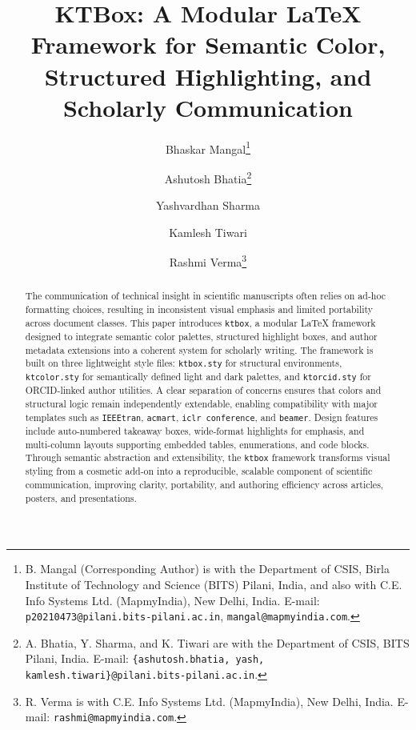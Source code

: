 \documentclass[12pt,onecolumn]{article}
\date{} %
\begin{document}
\title{KTBox: A Modular LaTeX Framework for Semantic Color, Structured Highlighting, and Scholarly Communication}


\author{%
  Bhaskar Mangal\thanks{B. Mangal (Corresponding Author) is with the Department of CSIS, Birla Institute of Technology and Science (BITS) Pilani, India, and also with C.E. Info Systems Ltd. (MapmyIndia), New Delhi, India. E-mail: \texttt{p20210473@pilani.bits-pilani.ac.in}, \texttt{mangal@mapmyindia.com}.}%
  \and
  Ashutosh Bhatia\thanks{A. Bhatia, Y. Sharma, and K. Tiwari are with the Department of CSIS, BITS Pilani, India. E-mail: \texttt{\{ashutosh.bhatia, yash, kamlesh.tiwari\}@pilani.bits-pilani.ac.in}.}%
  \and
  Yashvardhan Sharma%
  \and
  Kamlesh Tiwari%
  \and
  Rashmi Verma\thanks{R. Verma is with C.E. Info Systems Ltd. (MapmyIndia), New Delhi, India. E-mail: \texttt{rashmi@mapmyindia.com}.}%
}


  \maketitle

  \begin{abstract}
The communication of technical insight in scientific manuscripts often relies on ad-hoc formatting choices, resulting in inconsistent visual emphasis and limited portability across document classes. This paper introduces \texttt{ktbox}, a modular LaTeX framework designed to integrate semantic color palettes, structured highlight boxes, and author metadata extensions into a coherent system for scholarly writing. The framework is built on three lightweight style files: \texttt{ktbox.sty} for structural environments, \texttt{ktcolor.sty} for semantically defined light and dark palettes, and \texttt{ktorcid.sty} for ORCID-linked author utilities. A clear separation of concerns ensures that colors and structural logic remain independently extendable, enabling compatibility with major templates such as \texttt{IEEEtran}, \texttt{acmart}, \texttt{iclr conference}, and \texttt{beamer}. Design features include auto-numbered takeaway boxes, wide-format highlights for emphasis, and multi-column layouts supporting embedded tables, enumerations, and code blocks. Through semantic abstraction and extensibility, the \texttt{ktbox} framework transforms visual styling from a cosmetic add-on into a reproducible, scalable component of scientific communication, improving clarity, portability, and authoring efficiency across articles, posters, and presentations.

  \end{abstract}
\end{document}

